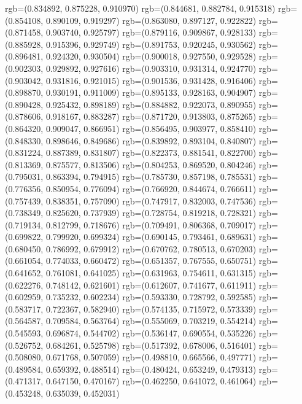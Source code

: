{{{					rgb=(0.834892, 0.875228, 0.910970)
					rgb=(0.844681, 0.882784, 0.915318)
					rgb=(0.854108, 0.890109, 0.919297)
					rgb=(0.863080, 0.897127, 0.922822)
					rgb=(0.871458, 0.903740, 0.925797)
					rgb=(0.879116, 0.909867, 0.928133)
					rgb=(0.885928, 0.915396, 0.929749)
					rgb=(0.891753, 0.920245, 0.930562)
					rgb=(0.896481, 0.924320, 0.930504)
					rgb=(0.900018, 0.927550, 0.929528)
					rgb=(0.902303, 0.929892, 0.927616)
					rgb=(0.903310, 0.931314, 0.924770)
					rgb=(0.903042, 0.931816, 0.921015)
					rgb=(0.901536, 0.931428, 0.916406)
					rgb=(0.898870, 0.930191, 0.911009)
					rgb=(0.895133, 0.928163, 0.904907)
					rgb=(0.890428, 0.925432, 0.898189)
					rgb=(0.884882, 0.922073, 0.890955)
					rgb=(0.878606, 0.918167, 0.883287)
					rgb=(0.871720, 0.913803, 0.875265)
					rgb=(0.864320, 0.909047, 0.866951)
					rgb=(0.856495, 0.903977, 0.858410)
					rgb=(0.848330, 0.898646, 0.849686)
					rgb=(0.839892, 0.893104, 0.840807)
					rgb=(0.831224, 0.887389, 0.831807)
					rgb=(0.822373, 0.881541, 0.822700)
					rgb=(0.813369, 0.875577, 0.813506)
					rgb=(0.804253, 0.869520, 0.804246)
					rgb=(0.795031, 0.863394, 0.794915)
					rgb=(0.785730, 0.857198, 0.785531)
					rgb=(0.776356, 0.850954, 0.776094)
					rgb=(0.766920, 0.844674, 0.766611)
					rgb=(0.757439, 0.838351, 0.757090)
					rgb=(0.747917, 0.832003, 0.747536)
					rgb=(0.738349, 0.825620, 0.737939)
					rgb=(0.728754, 0.819218, 0.728321)
					rgb=(0.719134, 0.812799, 0.718676)
					rgb=(0.709491, 0.806368, 0.709017)
					rgb=(0.699822, 0.799920, 0.699324)
					rgb=(0.690145, 0.793461, 0.689631)
					rgb=(0.680450, 0.786992, 0.679912)
					rgb=(0.670762, 0.780513, 0.670203)
					rgb=(0.661054, 0.774033, 0.660472)
					rgb=(0.651357, 0.767555, 0.650751)
					rgb=(0.641652, 0.761081, 0.641025)
					rgb=(0.631963, 0.754611, 0.631315)
					rgb=(0.622276, 0.748142, 0.621601)
					rgb=(0.612607, 0.741677, 0.611911)
					rgb=(0.602959, 0.735232, 0.602234)
					rgb=(0.593330, 0.728792, 0.592585)
					rgb=(0.583717, 0.722367, 0.582940)
					rgb=(0.574135, 0.715972, 0.573339)
					rgb=(0.564587, 0.709584, 0.563764)
					rgb=(0.555069, 0.703219, 0.554214)
					rgb=(0.545593, 0.696874, 0.544702)
					rgb=(0.536147, 0.690554, 0.535226)
					rgb=(0.526752, 0.684261, 0.525798)
					rgb=(0.517392, 0.678006, 0.516401)
					rgb=(0.508080, 0.671768, 0.507059)
					rgb=(0.498810, 0.665566, 0.497771)
					rgb=(0.489584, 0.659392, 0.488514)
					rgb=(0.480424, 0.653249, 0.479313)
					rgb=(0.471317, 0.647150, 0.470167)
					rgb=(0.462250, 0.641072, 0.461064)
					rgb=(0.453248, 0.635039, 0.452031)
}}}
